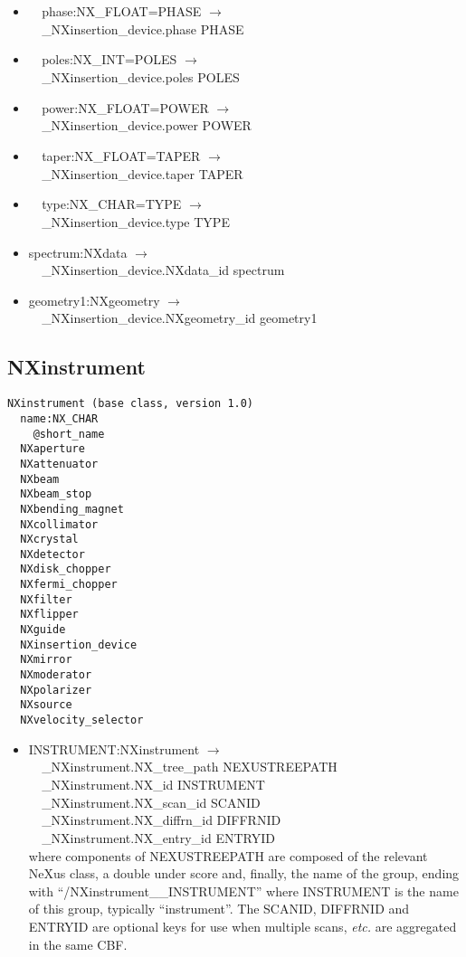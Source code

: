 \documentclass[11pt]{article}
\begin{document}
{{\begin{itemize}
\item{\verb|  |phase:NX\_FLOAT=PHASE $\rightarrow$\\
\verb|  |\_NXinsertion\_device.phase PHASE}

\item{\verb|  |poles:NX\_INT=POLES $\rightarrow$\\
\verb|  |\_NXinsertion\_device.poles POLES}

\item{\verb|  |power:NX\_FLOAT=POWER $\rightarrow$\\
\verb|  |\_NXinsertion\_device.power POWER}

\item{\verb|  |taper:NX\_FLOAT=TAPER $\rightarrow$\\
\verb|  |\_NXinsertion\_device.taper TAPER}

\item{\verb|  |type:NX\_CHAR=TYPE $\rightarrow$\\
\verb|  |\_NXinsertion\_device.type TYPE}

\item{spectrum:NXdata $\rightarrow$\\
\verb|  |\_NXinsertion\_device.NXdata\_id spectrum}

\item{geometry1:NXgeometry $\rightarrow$\\
\verb|  |\_NXinsertion\_device.NXgeometry\_id geometry1}
\end{itemize}
\subsection{NXinstrument}

\begin{verbatim}
NXinstrument (base class, version 1.0)
  name:NX_CHAR
    @short_name
  NXaperture
  NXattenuator
  NXbeam
  NXbeam_stop
  NXbending_magnet
  NXcollimator
  NXcrystal
  NXdetector
  NXdisk_chopper
  NXfermi_chopper
  NXfilter
  NXflipper
  NXguide
  NXinsertion_device
  NXmirror
  NXmoderator
  NXpolarizer
  NXsource
  NXvelocity_selector
\end{verbatim}

\begin{itemize}

\item{INSTRUMENT:NXinstrument $\rightarrow$\\
\verb|  |\_NXinstrument.NX\_tree\_path    NEXUSTREEPATH \\
\verb|  |\_NXinstrument.NX\_id            INSTRUMENT\\
\verb|  |\_NXinstrument.NX\_scan\_id      SCANID \\
\verb|  |\_NXinstrument.NX\_diffrn\_id    DIFFRNID \\
\verb|  |\_NXinstrument.NX\_entry\_id     ENTRYID \\
where components of NEXUSTREEPATH are composed of the
relevant NeXus class, a double under score and, finally, the
name of the group, ending with ``/NXinstrument\_\_INSTRUMENT''
where INSTRUMENT is the name of this group, typically ``instrument''.
The SCANID, DIFFRNID and ENTRYID are optional keys for use
when multiple scans, {\it etc.} are aggregated in the same CBF.}


\end{itemize}}}
\end{document}
